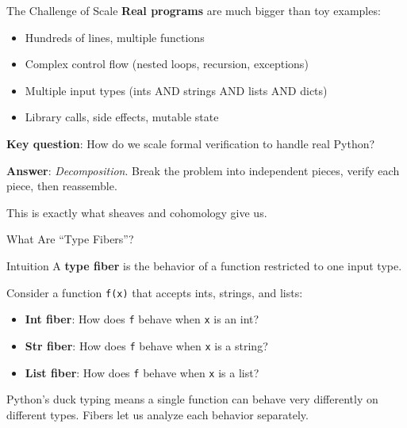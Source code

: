 \documentclass[aspectratio=169,11pt]{beamer}
\begin{document}
\begin{frame}{The Challenge of Scale}
\textbf{Real programs} are much bigger than toy examples:

\begin{itemize}
\item Hundreds of lines, multiple functions
\item Complex control flow (nested loops, recursion, exceptions)
\item Multiple input types (ints AND strings AND lists AND dicts)
\item Library calls, side effects, mutable state
\end{itemize}

\vspace{0.5em}
\textbf{Key question}: How do we scale formal verification to handle
real Python?

\textbf{Answer}: \emph{Decomposition}. Break the problem into
independent pieces, verify each piece, then reassemble.

This is exactly what sheaves and cohomology give us.
\end{frame}

\begin{frame}{What Are ``Type Fibers''?}
\begin{block}{Intuition}
A \textbf{type fiber} is the behavior of a function restricted to one
input type.
\end{block}

\vspace{0.5em}
Consider a function \texttt{f(x)} that accepts ints, strings, and lists:
\begin{itemize}
\item \textbf{Int fiber}: How does \texttt{f} behave when \texttt{x} is an int?
\item \textbf{Str fiber}: How does \texttt{f} behave when \texttt{x} is a string?
\item \textbf{List fiber}: How does \texttt{f} behave when \texttt{x} is a list?
\end{itemize}

\vspace{0.5em}
Python's duck typing means a single function can behave very differently
on different types.  Fibers let us analyze each behavior separately.
\end{frame}
\end{document}
